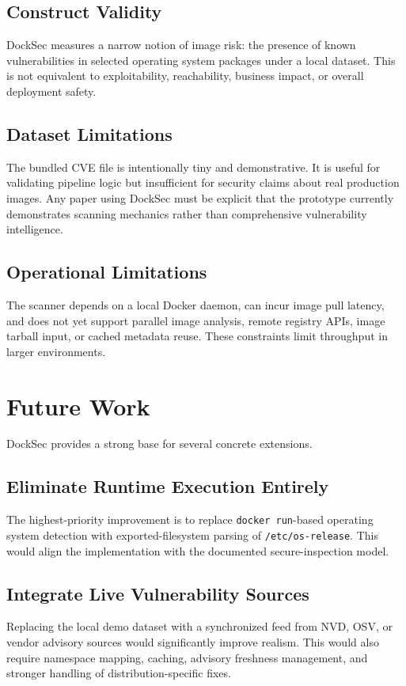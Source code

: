 \documentclass[12pt,draftclsnofoot,onecolumn]{IEEEtran}
\begin{document}
\subsection{Construct Validity}
DockSec measures a narrow notion of image risk: the presence of known vulnerabilities in selected operating system packages under a local dataset. This is not equivalent to exploitability, reachability, business impact, or overall deployment safety.

\subsection{Dataset Limitations}
The bundled CVE file is intentionally tiny and demonstrative. It is useful for validating pipeline logic but insufficient for security claims about real production images. Any paper using DockSec must be explicit that the prototype currently demonstrates scanning mechanics rather than comprehensive vulnerability intelligence.

\subsection{Operational Limitations}
The scanner depends on a local Docker daemon, can incur image pull latency, and does not yet support parallel image analysis, remote registry APIs, image tarball input, or cached metadata reuse. These constraints limit throughput in larger environments.

\section{Future Work}
DockSec provides a strong base for several concrete extensions.

\subsection{Eliminate Runtime Execution Entirely}
The highest-priority improvement is to replace \texttt{docker run}-based operating system detection with exported-filesystem parsing of \texttt{/etc/os-release}. This would align the implementation with the documented secure-inspection model.

\subsection{Integrate Live Vulnerability Sources}
Replacing the local demo dataset with a synchronized feed from NVD, OSV, or vendor advisory sources would significantly improve realism. This would also require namespace mapping, caching, advisory freshness management, and stronger handling of distribution-specific fixes.
\end{document}
